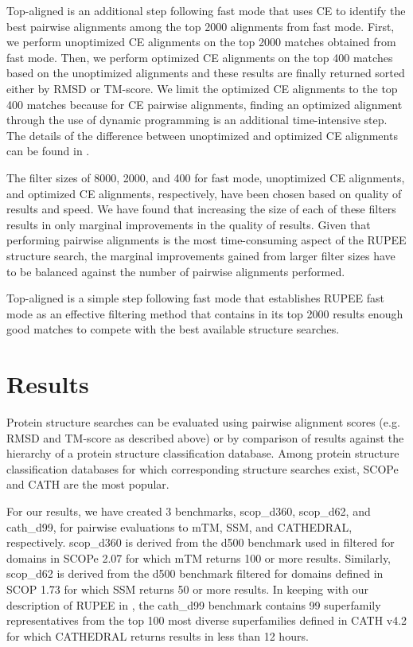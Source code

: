 \documentclass[10pt,letterpaper]{article}
\begin{document}
Top-aligned is an additional step following fast mode that uses CE to identify the best pairwise alignments among the top 2000 alignments from fast mode.
First, we perform unoptimized CE alignments on the top 2000 matches obtained from fast mode. 
Then, we perform optimized CE alignments on the top 400 matches based on the unoptimized alignments and these results are finally returned sorted either by RMSD or TM-score. 
We limit the optimized CE alignments to the top 400 matches because for CE pairwise alignments, finding an optimized alignment through the use of dynamic programming is an additional time-intensive step.
The details of the difference between unoptimized and optimized CE alignments can be found in \cite{Shindyalov1998}.

The filter sizes of 8000, 2000, and 400 for fast mode, unoptimized CE alignments, and optimized CE alignments, respectively, have been chosen based on quality of results and speed. 
We have found that increasing the size of each of these filters results in only marginal improvements in the quality of results. 
Given that performing pairwise alignments is the most time-consuming aspect of the RUPEE structure search, the marginal improvements gained from larger filter sizes have to be balanced against the number of pairwise alignments performed. 

Top-aligned is a simple step following fast mode that establishes RUPEE fast mode as an effective filtering method that contains in its top 2000 results enough good matches to compete with the best available structure searches.

\section*{Results}

Protein structure searches can be evaluated using pairwise alignment scores (e.g. RMSD and TM-score as described above) or by comparison of results against the hierarchy of a protein structure classification database.
Among protein structure classification databases for which corresponding structure searches exist, SCOPe \cite{Fox2013} and CATH \cite{Orengo1997} are the most popular. 

For our results, we have created 3 benchmarks, scop\_d360, scop\_d62, and cath\_d99, for pairwise evaluations to mTM, SSM, and CATHEDRAL, respectively.
scop\_d360 is derived from the d500 benchmark used in \cite{Dong2018} filtered for domains in SCOPe 2.07 for which mTM returns 100 or more results.
Similarly, scop\_d62 is derived from the d500 benchmark filtered for domains defined in SCOP 1.73 for which SSM returns 50 or more results.  
In keeping with our description of RUPEE in \cite{Ayoub2017}, the cath\_d99 benchmark contains 99 superfamily representatives from the top 100 most diverse superfamilies defined in CATH v4.2 for which CATHEDRAL returns results in less than 12 hours. 
\end{document}
